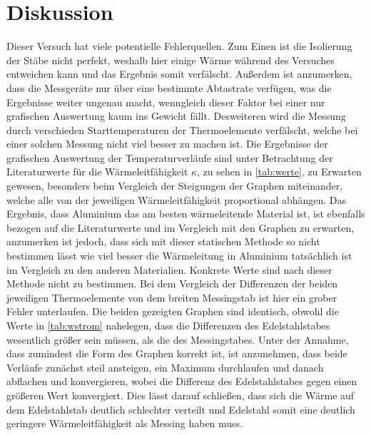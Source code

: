 \section{Diskussion}
\label{sec:Diskussion}
Dieser Versuch hat viele potentielle Fehlerquellen. Zum Einen ist die Isolierung der Stäbe nicht perfekt, weshalb hier einige Wärme während
des Versuches entweichen kann und das Ergebnis somit verfälscht. Außerdem ist anzumerken, dass die Messgeräte nur über eine bestimmte Abtastrate
verfügen, was die Ergebnisse weiter ungenau macht, wenngleich dieser Faktor bei einer nur grafischen Auswertung kaum ins Gewicht fällt.
Desweiteren wird die Messung durch verschieden Starttemperaturen der Thermoelemente verfälscht, welche bei einer solchen Messung nicht viel besser zu machen ist.
Die Ergebnisse der grafischen Auswertung der Temperaturverläufe sind unter Betrachtung der Literaturwerte für die Wärmeleitfähigkeit $\kappa$, zu sehen in  
\autoref{tab:werte}, zu Erwarten gewesen, besonders beim Vergleich der Steigungen der Graphen miteinander, welche alle von der jeweiligen Wärmeleitfähigkeit proportional
abhängen. Das Ergebnis, dass Aluminium das am besten wärmeleitende Material ist, ist ebenfalls bezogen auf die Literaturwerte und im Vergleich mit den Graphen
zu erwarten, anzumerken ist jedoch, dass sich mit dieser statischen Methode so nicht bestimmen lässt wie viel besser die Wärmeleitung in Aluminium
tatsächlich ist im Vergleich zu den anderen Materialien. Konkrete Werte sind nach dieser Methode nicht zu bestimmen.
Bei dem Vergleich der Differenzen der beiden jeweiligen Thermoelemente von dem breiten Messingstab ist hier ein grober Fehler unterlaufen.
Die beiden gezeigten Graphen sind identisch, obwohl die Werte in \autoref{tab:wstrom} nahelegen, dass die Differenzen des Edelstahlstabes wesentlich größer
sein müssen, als die des Messingstabes. Unter der Annahme, dass zumindest die Form des Graphen korrekt ist, ist anzunehmen, dass beide Verläufe zunächst steil ansteigen, ein Maximum
durchlaufen und danach abflachen und konvergieren, wobei die Differenz des Edelstahlstabes gegen einen größeren Wert konvergiert.
Dies lässt darauf schließen, dass sich die Wärme auf dem Edelstahlstab deutlich schlechter verteilt und Edelstahl somit eine deutlich geringere Wärmeleitfähigkeit
als Messing haben muss.

